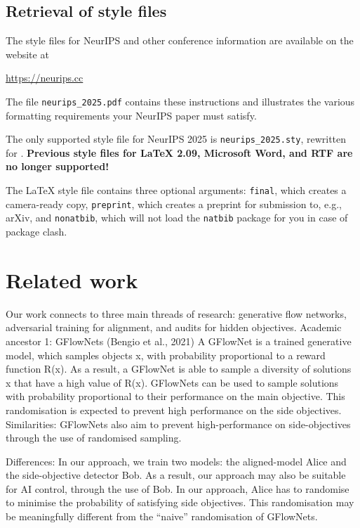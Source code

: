 \documentclass{article}
\begin{document}
\subsection{Retrieval of style files}


The style files for NeurIPS and other conference information are available on
the website at
\begin{center}
  \url{https://neurips.cc}
\end{center}
The file \verb+neurips_2025.pdf+ contains these instructions and illustrates the
various formatting requirements your NeurIPS paper must satisfy.


The only supported style file for NeurIPS 2025 is \verb+neurips_2025.sty+,
rewritten for \LaTeXe{}.  \textbf{Previous style files for \LaTeX{} 2.09,
  Microsoft Word, and RTF are no longer supported!}


The \LaTeX{} style file contains three optional arguments: \verb+final+, which
creates a camera-ready copy, \verb+preprint+, which creates a preprint for
submission to, e.g., arXiv, and \verb+nonatbib+, which will not load the
\verb+natbib+ package for you in case of package clash.

\section{Related work}

Our work connects to three main threads of research: generative flow networks, adversarial training for alignment, and audits for hidden objectives.
Academic ancestor 1: GFlowNets (Bengio et al., 2021)
A GFlowNet is a trained generative model, which samples objects x, with probability proportional to a reward function R(x). As a result, a GFlowNet is able to sample a diversity of solutions x that have a high value of R(x). GFlowNets can be used to sample solutions with probability proportional to their performance on the main objective. This randomisation is expected to prevent high performance on the side objectives.
Similarities:
GFlowNets also aim to prevent high-performance on side-objectives through the use of randomised sampling.


Differences:
In our approach, we train two models: the aligned-model Alice and the side-objective detector Bob. As a result, our approach may also be suitable for AI control, through the use of Bob.
In our approach, Alice has to randomise to minimise the probability of satisfying side objectives. This randomisation may be meaningfully different from the “naive” randomisation of GFlowNets.
\end{document}
